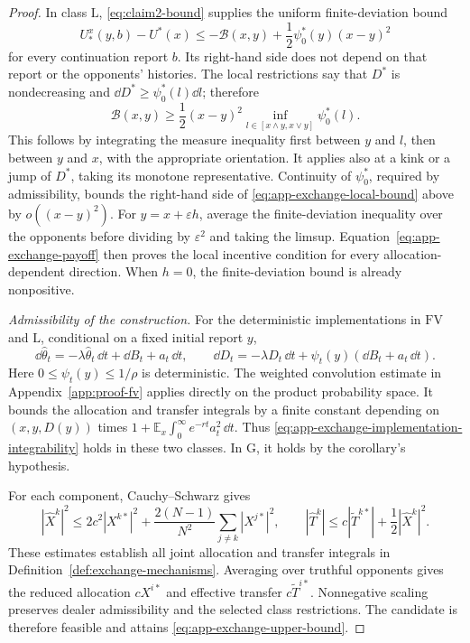 \documentclass[12pt]{article}
\newcommand{\E}{\mathbb{E}}
\begin{document}
\begin{proof}
In class \(\mathrm L\), \eqref{eq:claim2-bound} supplies the uniform
finite-deviation bound
\begin{equation}\label{eq:app-exchange-local-bound}
  U_*^x(y,b)-U^*(x)
  \leq -\mathcal B(x,y)
       +\frac12\psi_0^*(y)(x-y)^2
\end{equation}
for every continuation report \(b\). Its right-hand side does not
depend on that report or the opponents' histories. The local
restrictions say that \(D^*\) is nondecreasing and
\(\dd D^*\geq\psi_0^*(l)\dd l\); therefore
\[
  \mathcal B(x,y)
  \geq
  \frac12(x-y)^2
    \inf_{l\in[x\wedge y,x\vee y]}\psi_0^*(l).
\]
This follows by integrating the measure inequality first between
\(y\) and \(l\), then between \(y\) and \(x\), with the appropriate
orientation. It applies also at a kink or a jump of \(D^*\), taking
its monotone representative. Continuity of \(\psi_0^*\), required by
admissibility, bounds the right-hand side of
\eqref{eq:app-exchange-local-bound} above by \(o((x-y)^2)\).
For \(y=x+\varepsilon h\), average the finite-deviation inequality
over the opponents before dividing by \(\varepsilon^2\) and taking
the limsup. Equation~\eqref{eq:app-exchange-payoff} then proves the
local incentive condition for every allocation-dependent direction.
When \(h=0\), the finite-deviation bound is already nonpositive.

\emph{Admissibility of the construction.}
For the deterministic implementations in \(\mathrm{FV}\) and
\(\mathrm L\), conditional on a fixed initial report \(y\),
\[
  \dd\widehat\theta_t=-\lambda\widehat\theta_t\,\dd t
                         +\dd B_t+a_t\,\dd t,\qquad
  \dd D_t=-\lambda D_t\,\dd t
                    +\psi_t(y)(\dd B_t+a_t\,\dd t).
\]
Here \(0\leq\psi_t(y)\leq1/\rho\) is deterministic.
The weighted convolution estimate in Appendix~\ref{app:proof-fv}
applies directly on the product probability space. It bounds the
allocation and transfer integrals by a finite constant depending on
\((x,y,D(y))\) times
\(1+\E_x\int_0^\infty e^{-rt}a_t^2\,\dd t\).
Thus \eqref{eq:app-exchange-implementation-integrability} holds
in these two classes. In \(\mathrm G\), it holds by the corollary's
hypothesis.

For each component, Cauchy--Schwarz gives
\[
  |\widehat X^k|^2
  \leq 2c^2|X^{k\ast}|^2+
       \frac{2(N-1)}{N^2}\sum_{j\ne k}|X^{j\ast}|^2,
  \qquad
  |\widehat T^k|
  \leq c|\widetilde T^{k\ast}|+\frac12|\widehat X^k|^2 .
\]
These estimates establish all joint allocation and transfer integrals
in Definition~\ref{def:exchange-mechanisms}. Averaging over truthful
opponents gives the reduced allocation \(cX^{i\ast}\) and effective
transfer \(c\widetilde T^{i\ast}\). Nonnegative scaling preserves
dealer admissibility and the selected class restrictions.
The candidate is therefore feasible and attains
\eqref{eq:app-exchange-upper-bound}.
\end{proof}
\end{document}
